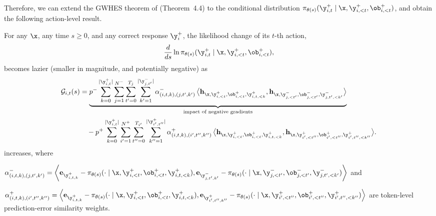 Therefore, we can extend the GWHES theorem of \cite{deng2025effect} (Theorem~4.4) to the conditional distribution
$\pi_{\theta(s)}(\y^+_{i,t} \mid \x, \y^+_{i,<t}, \ob^+_{i,<t})$, and obtain the following action-level result.

\begin{theorem}
\label{the:ghes-a}
For any $\x$, any time $s\ge0$, and any correct response $\y_i^+$, the likelihood change of its
$t$-th action,
\[
\frac{d}{ds}\ln \pi_{\theta(s)}(\y_{i,t}^+ \mid \x, \y^+_{i,<t}, \ob^+_{i,<t}),
\]
becomes lazier (smaller in magnitude, and potentially negative) as
\begin{align}
\mathcal{G}_{i,t}(s)
& =
\underbrace{p^-
\sum_{k=0}^{|\y^+_{i,t}|}\sum_{j=1}^{N^-} 
\sum_{t'=0}^{T_j}\sum_{k'=1}^{|\y_{j,t'}^-|}
\alpha^-_{(i,t,k),(j,t',k')}\,
\bigl\langle
\mathbf{h}_{\x,\y^+_{i,<t},\ob^+_{i,<t},\y_{i,t,<k}^+},
\mathbf{h}_{\x,\y^-_{j,<t'},\ob^-_{j,<t'},\y_{j,t',<k'}^-}
\bigr\rangle}_{\text{impact of negative gradients}} \nonumber
\\ &\quad -
p^+
\sum_{k=0}^{|\y^+_{i,t}|} \sum_{i'=1}^{N^+} \sum_{t''=0}^{T_{i'}}
\sum_{k''=1}^{|\y_{i',t''}^+|}
\alpha^+_{(i,t,k),(i',t'',k'')}\,
\bigl\langle
\mathbf{h}_{\x,\y^+_{i,<t},\ob^+_{i,<t},\y_{i,t,<k}^+},
\mathbf{h}_{\x,\y^+_{i',<t''},\ob^+_{i',<t''},\y_{i',t'',<k''}^+}
\bigr\rangle .
\end{align}
increases, where

$\alpha^-_{(i,t,k),(j,t',k')} = \left\langle
\mathbf{e}_{\y^+_{i,t,k}} - \pi_{\theta(s)} (\cdot \mid \x, \y^+_{i,<t}, \ob^+_{i,<t}, \y^+_{i,t,<k}),
\mathbf{e}_{\y^-_{j,t',k'}}-\pi_{\theta(s)} (\cdot \mid \x, \y^-_{j,<t'}, \ob^-_{j,<t'}, \y^-_{j,t',<k'})
\right\rangle$ and 

$\alpha^+_{(i,t,k),(i',t'',k'')} = \left\langle
\mathbf{e}_{\y^+_{i,t,k}} - \pi_{\theta(s)} (\cdot \mid \x, \y^+_{i,<t}, \ob^+_{i,<t}, \y^+_{i,t,<k}),
\mathbf{e}_{\y^+_{i',t'',k''}} - \pi_{\theta(s)} (\cdot \mid \x, \y^+_{i',<t''}, \ob^+_{i',<t''}, \y^+_{i',t'',<k''})
\right\rangle$ 
are token-level
prediction-error similarity weights.
\end{theorem}


